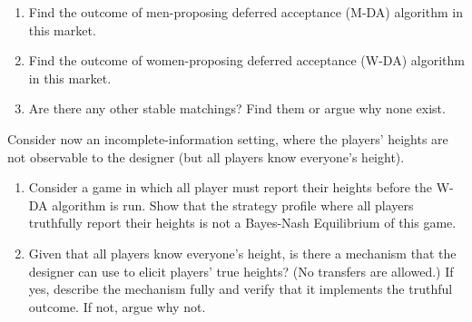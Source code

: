 \documentclass[a4paper]{article}
\newif\ifsolutions
\begin{document}
	\begin{enumerate}
		\item %
		Find the outcome of men-proposing deferred acceptance (M-DA) algorithm in this market.
		\item %
		Find the outcome of women-proposing deferred acceptance (W-DA) algorithm in this market.
		\item %
		Are there any other stable matchings? Find them or argue why none exist.
	\end{enumerate}
	Consider now an incomplete-information setting, where the players' heights are not observable to the designer (but all players know everyone's height). 
	\begin{enumerate}[resume]
		\item %
		Consider a game in which all player must report their heights before the W-DA algorithm is run. Show that the strategy profile where all players truthfully report their heights is not a Bayes-Nash Equilibrium of this game.
		\item %
		Given that all players know everyone's height, is there a mechanism that the designer can use to elicit players' true heights? (No transfers are allowed.) If yes, describe the mechanism fully and verify that it implements the truthful outcome. If not, argue why not.
	\end{enumerate}


\ifsolutions
\end{document}
